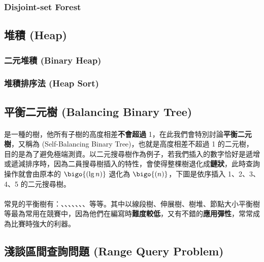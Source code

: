 \documentclass[12pt,a4paper,oneside]{report}
\begin{document}
\begin{CJK}{UTF8}{bkai}
\subsubsection{Disjoint-set Forest}

\subsection{堆積 (Heap)}
\subsubsection{二元堆積 (Binary Heap)}
\subsubsection{堆積排序法 (Heap Sort)}

\subsection{平衡二元樹 (Balancing Binary Tree)}

\paragraph{} 是一種的樹，他所有子樹的高度相差\textbf{不會超過} 1，在此我們會特別討論\textbf{平衡二元樹}，又稱為\textbf{} (Self-Balancing Binary Tree)，也就是高度相差不超過 1 的二元樹，目的是為了避免極端測資。以二元搜尋樹作為例子，若我們插入的數字恰好是遞增或遞減排序時，因為二員搜尋樹插入的特性，會使得整棵樹退化成\textbf{鏈狀}，此時查詢操作就會由原本的 $\bigo{(\lg{n})}$ 退化為 $\bigo{(n)}$，下圖是依序插入 1、2、3、4、5 的二元搜尋樹。

\paragraph{}常見的平衡樹有：、、、、、、、等等。其中以線段樹、伸展樹、樹堆、節點大小平衡樹等最為常用在競賽中，因為他們在編寫時\textbf{難度較低}，又有不錯的\textbf{應用彈性}，常常成為比賽時強大的利器。

\subsection{淺談區間查詢問題 (Range Query Problem)}\label{tree:subsec:rqp}


\end{CJK}
\end{document}
